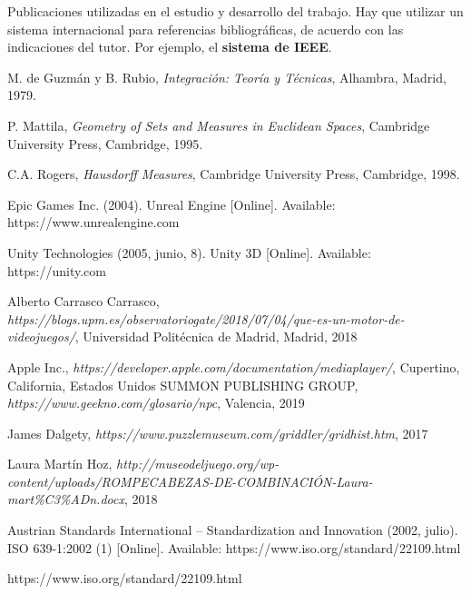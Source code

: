\begin{thebibliography}{99}
 Publicaciones utilizadas en el estudio y desarrollo del trabajo.
Hay que utilizar un sistema internacional para referencias bibliográficas, de acuerdo con las indicaciones del tutor. Por ejemplo, el \textbf{sistema de IEEE}.

 M. de Guzmán y B. Rubio, \textit{Integración: Teoría y Técnicas}, Alhambra, Madrid, 1979.

 P. Mattila, \textit{Geometry of Sets and Measures in Euclidean Spaces}, Cambridge University Press, Cambridge, 1995.

 C.A. Rogers, \textit{Hausdorff Measures}, Cambridge University Press, Cambridge, 1998.

 Epic Games Inc. (2004). Unreal Engine [Online]. Available: https://www.unrealengine.com

 Unity Technologies (2005, junio, 8). Unity 3D [Online]. Available: https://unity.com

 Alberto Carrasco Carrasco, \textit{https://blogs.upm.es/observatoriogate/2018/07/04/que-es-un-motor-de-videojuegos/}, Universidad Politécnica de Madrid, Madrid, 2018

 Apple Inc., \textit{https://developer.apple.com/documentation/mediaplayer/}, Cupertino, California, Estados Unidos
 SUMMON PUBLISHING GROUP, \textit{https://www.geekno.com/glosario/npc}, Valencia, 2019

 James Dalgety, \textit{https://www.puzzlemuseum.com/griddler/gridhist.htm}, 2017

 Laura Martín Hoz, \textit{http://museodeljuego.org/wp-content/uploads/ROMPECABEZAS-DE-COMBINACIÓN-Laura-mart\%C3\%ADn.docx}, 2018

 Austrian Standards International – Standardization and Innovation (2002, julio). ISO 639-1:2002 (1) [Online]. Available: https://www.iso.org/standard/22109.html

https://www.iso.org/standard/22109.html

\end{thebibliography}
